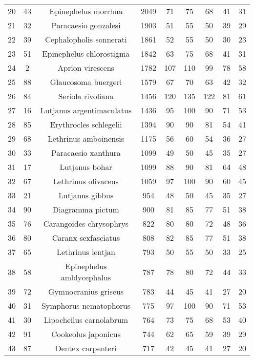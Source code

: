 \documentclass{report}\usepackage[]{graphicx}\usepackage[]{color}
\begin{document}
{\begin{longtable}{ccccccccc}
  20 & 43 & Epinephelus morrhua & 2049 & 71 & 75 & 68 & 41 & 31 \\ 
  21 & 32 & Paracaesio gonzalesi & 1903 & 51 & 55 & 50 & 39 & 29 \\ 
  22 & 39 & Cephalopholis sonnerati & 1861 & 52 & 55 & 50 & 30 & 23 \\ 
  23 & 51 & Epinephelus chlorostigma & 1842 & 63 & 75 & 68 & 41 & 31 \\ 
  24 & 2 & Aprion virescens & 1782 & 107 & 110 & 99 & 78 & 58 \\ 
  25 & 88 & Glaucosoma buergeri & 1579 & 67 & 70 & 63 & 42 & 32 \\ 
  26 & 84 & Seriola rivoliana & 1456 & 120 & 135 & 122 & 81 & 61 \\ 
  27 & 16 & Lutjanus argentimaculatus & 1436 & 95 & 100 & 90 & 71 & 53 \\ 
  28 & 85 & Erythrocles schlegelii & 1394 & 90 & 90 & 81 & 54 & 41 \\ 
  29 & 68 & Lethrinus amboinensis & 1175 & 56 & 60 & 54 & 36 & 27 \\ 
  30 & 33 & Paracaesio xanthura & 1099 & 49 & 50 & 45 & 35 & 27 \\ 
  31 & 17 & Lutjanus bohar & 1099 & 88 & 90 & 81 & 64 & 48 \\ 
  32 & 67 & Lethrinus olivaceus & 1059 & 97 & 100 & 90 & 60 & 45 \\ 
  33 & 21 & Lutjanus gibbus & 954 & 48 & 50 & 45 & 35 & 27 \\ 
  34 & 90 & Diagramma pictum & 900 & 81 & 85 & 77 & 51 & 38 \\ 
  35 & 76 & Carangoides chrysophrys & 822 & 80 & 80 & 72 & 48 & 36 \\ 
  36 & 80 & Caranx sexfasciatus & 808 & 82 & 85 & 77 & 51 & 38 \\ 
  37 & 65 & Lethrinus lentjan & 793 & 50 & 55 & 50 & 33 & 25 \\ 
  38 & 58 & Epinephelus amblycephalus & 787 & 78 & 80 & 72 & 44 & 33 \\ 
  39 & 72 & Gymnocranius griseus & 783 & 44 & 45 & 41 & 27 & 20 \\ 
  40 & 31 & Symphorus nematophorus & 775 & 97 & 100 & 90 & 71 & 53 \\ 
  41 & 30 & Lipocheilus carnolabrum & 764 & 73 & 75 & 68 & 53 & 40 \\ 
  42 & 91 & Cookeolus japonicus & 744 & 62 & 65 & 59 & 39 & 29 \\ 
  43 & 87 & Dentex carpenteri & 717 & 42 & 45 & 41 & 27 & 20 \\ 

\end{longtable}}
\end{document}
